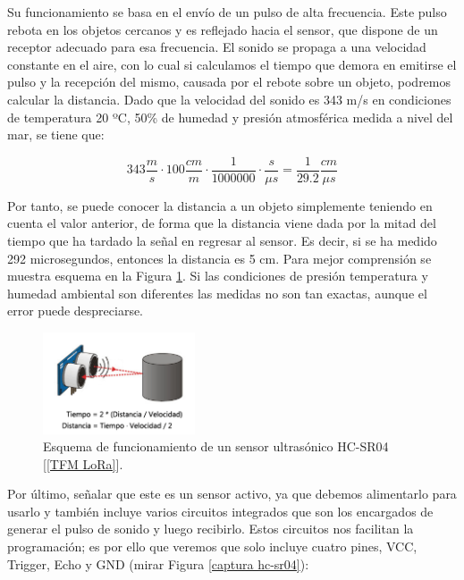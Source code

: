 \documentclass[12pt]{article}
\begin{document}
	\pagebreak
	
	\noindent Su funcionamiento se basa en el envío de un pulso de alta frecuencia. Este pulso rebota en los objetos cercanos y es reflejado hacia el sensor, que dispone de un receptor adecuado para esa frecuencia. El sonido se propaga a una velocidad constante en el aire, con lo cual si calculamos el tiempo que demora en emitirse el pulso y la recepción del mismo, causada por el rebote sobre un objeto, podremos calcular la distancia. Dado que la velocidad del sonido es 343 m/s en condiciones de temperatura 20 ºC, 50\% de humedad y presión atmosférica medida a nivel del mar, se tiene que:
	
	\begin{equation} \label{Cálculo multiplicador HC-SR04}
		343 \frac{m}{s} \cdot 100 \frac{cm}{m} \cdot \frac{1}{1000000} \cdot \frac{s}{\mu s} = \frac{1}{29.2} \frac{cm}{\mu s}
	\end{equation}
	
	\noindent Por tanto, se puede conocer la distancia a un objeto simplemente teniendo en cuenta el valor anterior, de forma que la distancia viene dada por la mitad del tiempo que ha tardado la señal en regresar al sensor. Es decir, si se ha medido 292 microsegundos, entonces la distancia es 5 cm. Para mejor comprensión se muestra esquema en la Figura \ref{esquema funcionamiento hc-sr04}. Si las condiciones de presión temperatura y humedad ambiental son diferentes las medidas no son tan exactas, aunque el error puede despreciarse. \\
	
	
	\begin{figure}[h]
		\begin{center}
			\includegraphics[width=0.4\textwidth]{img/esquema_funcionamiento_hcsr04.png}
			\caption{Esquema de funcionamiento de un sensor ultrasónico HC-SR04 [\ref{TFM LoRa}].}
			\label{esquema funcionamiento hc-sr04}
		\end{center}
	\end{figure}

	\noindent Por último, señalar que este es un sensor activo, ya que debemos alimentarlo para usarlo y también incluye varios circuitos integrados que son los encargados de generar el pulso de sonido y luego recibirlo. Estos circuitos nos facilitan la programación; es por ello que veremos que solo incluye cuatro pines, VCC, Trigger, Echo y GND (mirar Figura \ref{captura hc-sr04}):
	
\end{document}
